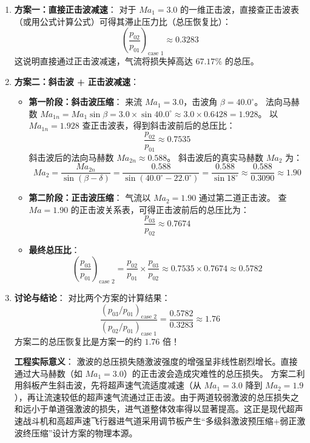\documentclass[11pt,a4paper]{ctexart}
\begin{document}
\begin{enumerate}
    \item \textbf{方案一：直接正击波减速}：
    对于 $Ma_1 = 3.0$ 的一维正击波，直接查正击波表（或用公式计算公式）可得其滞止压力比（总压恢复比）：
    \[
    \left(\frac{p_{02}}{p_{01}}\right)_{\text{case 1}} \approx 0.3283
    \]
    这说明直接通过正击波减速，气流将损失掉高达 $67.17\%$ 的总压。

    \item \textbf{方案二：斜击波 + 正击波减速}：
    \begin{itemize}
        \item \textbf{第一阶段：斜击波压缩}：
        来流 $Ma_1 = 3.0$，击波角 $\beta = 40.0^\circ$。
        法向马赫数 $Ma_{1n} = Ma_1 \sin \beta = 3.0 \times \sin 40.0^\circ \approx 3.0 \times 0.6428 = 1.928$。
        以 $Ma_{1n} = 1.928$ 查正击波表，得到斜击波前后的总压比：
        \[
        \frac{p_{02}}{p_{01}} \approx 0.7535
        \]
        斜击波后的法向马赫数 $Ma_{2n} \approx 0.588$。
        斜击波后的真实马赫数 $Ma_2$ 为：
        \[
        Ma_2 = \frac{Ma_{2n}}{\sin(\beta - \delta)} = \frac{0.588}{\sin(40.0^\circ - 22.0^\circ)} = \frac{0.588}{\sin 18^\circ} \approx \frac{0.588}{0.3090} \approx 1.90
        \]
        
        \item \textbf{第二阶段：正击波压缩}：
        气流以 $Ma_2 = 1.90$ 通过第二道正击波。
        查 $Ma = 1.90$ 的正击波关系表，可得正击波前后的总压比为：
        \[
        \frac{p_{03}}{p_{02}} \approx 0.7674
        \]
        
        \item \textbf{最终总压比}：
        \[
        \left(\frac{p_{03}}{p_{01}}\right)_{\text{case 2}} = \frac{p_{02}}{p_{01}} \times \frac{p_{03}}{p_{02}} \approx 0.7535 \times 0.7674 \approx 0.5782
        \]
    \end{itemize}

    \item \textbf{讨论与结论}：
    对比两个方案的计算结果：
    \[
    \frac{\left(p_{03}/p_{01}\right)_{\text{case 2}}}{\left(p_{02}/p_{01}\right)_{\text{case 1}}} = \frac{0.5782}{0.3283} \approx 1.76
    \]
    方案二的总压恢复比是方案一的约 $1.76$ 倍！
    
    \textbf{工程实际意义}：
    激波的总压损失随激波强度的增强呈非线性剧烈增长。直接通过大马赫数（如 $Ma_1=3.0$）的正击波会造成灾难性的总压损失。
    方案二利用斜板产生斜击波，先将超声速气流适度减速（从 $Ma_1=3.0$ 降到 $Ma_2=1.9$），再让流速较低的超声速气流通过正击波。由于两道较弱激波的总压损失之和远小于单道强激波的损失，进气道整体效率得以显著提高。这正是现代超声速战斗机和高超声速飞行器进气道采用调节板产生“多级斜激波预压缩+弱正激波终压缩”设计方案的物理本源。
\end{enumerate}
\end{document}
